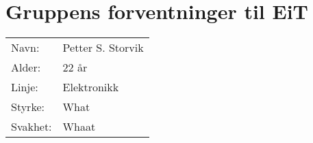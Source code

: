 \section{Gruppens forventninger til EiT}
\begin{table}[H]
    \begin{tabular}{l l}
        Navn: & Petter S. Storvik \\
        Alder: & 22 år \\ 
        Linje: & Elektronikk \\
        Styrke: & What \\
        Svakhet: & Whaat 
    \end{tabular}
\end{table}

\lipsum[0-1]
